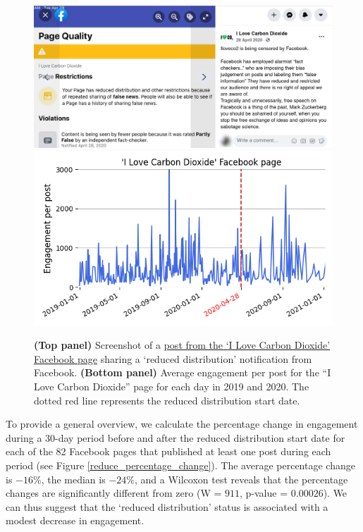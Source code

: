 \documentclass[11pt,a4paper]{article}
\begin{document}
\begin{figure}[!h]
\centering
\includegraphics[width=\linewidth]{./../figure/reduce_example_screenshot.png}
\includegraphics[width=\linewidth]{./../figure/reduce_example_timeseries.png}
\caption{
{\bf(Top panel)} Screenshot of a \href{https://archive.is/ie4dR}{post from the `I Love Carbon Dioxide' Facebook page} sharing a `reduced distribution' notification from Facebook. 
{\bf(Bottom panel)} Average engagement per post for the “I Love Carbon Dioxide” page for each day in 2019 and 2020.
The dotted red line represents the reduced distribution start date.}
\label{reduce_example}
\end{figure}

To provide a general overview, we calculate the percentage change in engagement during a 30-day period before and after the reduced distribution start date for each of the 82 Facebook pages that published at least one post during each period (see Figure \ref{reduce_percentage_change}).
The average percentage change is $-16\%$, the median is $-24\%$, and a Wilcoxon test reveals that the percentage changes are significantly different from zero (W = $911$, p-value = $0.00026$).
We can thus suggest that the `reduced distribution' status is associated with a modest decrease in engagement. 
\end{document}
